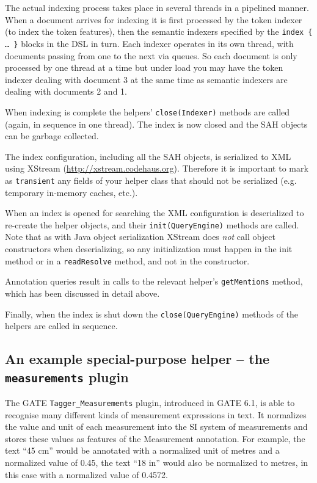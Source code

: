 The actual indexing process takes place in several threads in a pipelined
manner.  When a document arrives for indexing it is first processed by the
token indexer (to index the token features), then the semantic indexers
specified by the {\tt index \{ \ldots\ \}} blocks in the DSL in turn.  Each
indexer operates in its own thread, with documents passing from one to the next
via queues.  So each document is only processed by one thread at a time but
under load you may have the token indexer dealing with document 3 at the same
time as semantic indexers are dealing with documents 2 and 1.

When indexing is complete the helpers' {\tt close(Indexer)} methods are called
(again, in sequence in one thread).  The index is now closed and the SAH
objects can be garbage collected.

The index configuration, including all the SAH objects, is serialized to XML
using XStream (\url{http://xstream.codehaus.org}). Therefore it is important to
mark as \lstinline!transient! any fields of your helper class that should not be
serialized (e.g. temporary in-memory caches, etc.).

When an index is opened for searching the XML configuration is deserialized to
re-create the helper objects, and their {\tt init(QueryEngine)} methods are
called.  Note that as with Java object serialization XStream does {\em not}
call object constructors when deserializing, so any initialization must happen
in the init method or in a {\tt readResolve} method, and not in the
constructor.

Annotation queries result in calls to the relevant helper's {\tt getMentions}
method, which has been discussed in detail above.

Finally, when the index is shut down the {\tt close(QueryEngine)} methods of
the helpers are called in sequence.

\subsection{An example special-purpose helper -- the {\tt measurements} plugin}
\label{sec:extend:measurement-helper}

The GATE {\tt Tagger\_Measurements} plugin, introduced in GATE 6.1, is able to
recognise many different kinds of measurement expressions in text.  It
normalizes the value and unit of each measurement into the SI system of
measurements and stores these values as features of the Measurement annotation.
For example, the text ``45 cm'' would be annotated with a normalized unit of
metres and a normalized value of 0.45, the text ``18 in'' would also be
normalized to metres, in this case with a normalized value of 0.4572.

